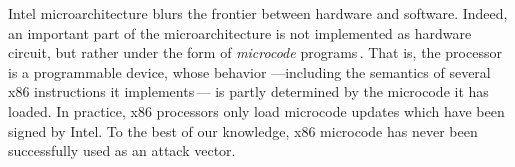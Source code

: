 %
%

Intel microarchitecture blurs the frontier between hardware and software.
%
Indeed, an important part of the microarchitecture is not implemented as
hardware circuit, but rather under the form of \emph{microcode}
programs\,\cite[Section 2.14]{costan2016sgxexplained}.
%
That is, the processor is a programmable device, whose behavior ---including the
semantics of several x86 instructions it
implements\,\cite{johnson2015patentsgx}--- is partly determined by the microcode
it has loaded.
%
In practice, x86 processors only load microcode updates which have been signed
by Intel.
%
To the best of our knowledge, x86 microcode has never been successfully used as
an attack vector.

